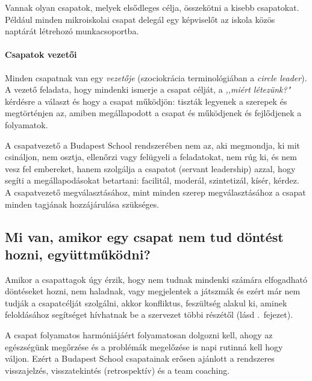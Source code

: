 Vannak olyan csapatok, melyek elsődleges célja, összekötni a kisebb
csapatokat. Például minden mikroiskolai csapat delegál egy képviselőt az
iskola közös naptárát létrehozó munkacsoportba.


\paragraph{Csapatok vezetői}

Minden csapatnak van egy \emph{vezetője} (szociokrácia terminológiában a
\emph{circle leader}). A vezető feladata, hogy mindenki ismerje a csapat
célját, a \emph{,,miért létezünk?"} kérdésre a választ és hogy a csapat
működjön: tiszták legyenek a szerepek és megtörténjen az, amiben
megállapodott a csapat és működjenek és fejlődjenek a folyamatok.

A csapatvezető a Budapest School rendszerében nem az, aki megmondja, ki
mit csináljon, nem osztja, ellenőrzi vagy felügyeli a feladatokat, nem
rúg ki, és nem vesz fel embereket, hanem szolgálja a csapatot (servant
leadership) azzal, hogy segíti a megállapodásokat betartani: facilitál,
moderál, szintetizál, kísér, kérdez. A csapatvezető megválasztásához,
mint minden szerep megválasztásához a csapat minden tagjának
hozzájárulása szükséges.







\subsection{Mi van, amikor egy csapat nem tud döntést hozni,
együttműködni?}

Amikor a csapattagok úgy érzik, hogy nem tudnak mindenki számára
elfogadható döntéseket hozni, nem haladnak, vagy megjelentek a játszmák
és ezért már nem tudják a csapatcélját szolgálni, akkor konfliktus,
feszültség alakul ki, aminek feloldásához segítséget hívhatnak be a
szervezet többi részétől (lásd .~fejezet).

A csapat folyamatos harmóniájáért folyamatosan dolgozni kell, ahogy az
egészségünk megőrzése és a problémák megelőzése is napi rutinná kell
hogy váljon. Ezért a Budapest School csapatainak erősen ajánlott a
rendszeres visszajelzés, visszatekintés (retrospektív) és a team
coaching.